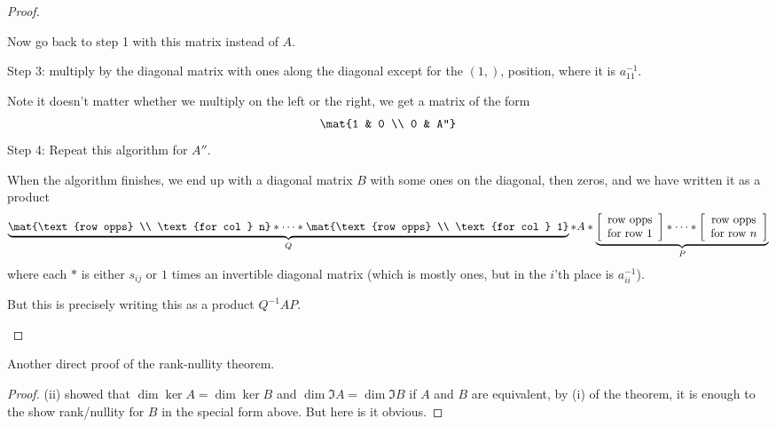 \begin{proof}
\begin{enumerate}
		Now go back to step 1 with this matrix instead of $A$.
		
		Step 3: multiply by the diagonal matrix with ones along the diagonal except for the $(1,)$, position, where it is
$a_{11}^{-1}$. %

		Note it doesn't matter whether we multiply on the left or the right, we get a matrix of the form
		\begin{equation*}
			\mat{1 & 0 \\ 0 & A''}
		\end{equation*}
		Step 4: Repeat this algorithm for $A''$.

		When the algorithm finishes, we end up with a diagonal matrix $B$ with some ones on the diagonal, then zeros, and we have written it as	a product %
		\begin{equation*}
			\underbrace{
			\mat{\text{row opps} \\ \text{for col } n}
			* \cdots *
			\mat{\text{row opps} \\ \text{for col } 1}
			}_Q
			* A *
			\underbrace{
			\left[ \begin{array}{cc} \text{row opps} \\ \text{for row } 1 \end{array} \right]
			* \cdots *
			\left[ \begin{array}{cc} \text{row opps} \\ \text{for row } n \end{array} \right]
			}_P
		\end{equation*}
		where each $*$ is either $s_{ij}$ or $1$ times an invertible diagonal matrix (which is mostly ones, but in the $i$'th place is $a_{ii}^{-1}$). %

		But this is precisely writing this as a product $Q^{-1}AP$. \qedhere
	\end{enumerate}
\end{proof}

\begin{corollary}
	Another direct proof of the rank-nullity theorem. %
\end{corollary}

\begin{proof}
	(ii) showed that $\dim\ker A = \dim\ker B$ and $\dim\Im A = \dim\Im B$ if $A$ and $B$ are equivalent, by (i) of the theorem, it is enough to the show rank/nullity for $B$ in the special form above. But here is it obvious. %
\end{proof}

